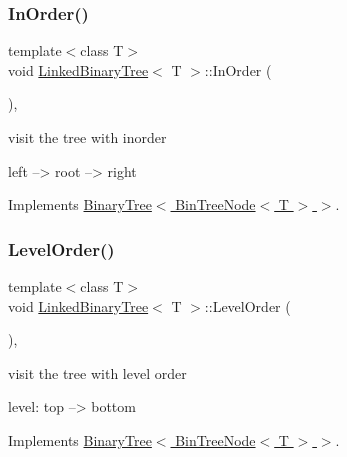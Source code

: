 \subsubsection{\texorpdfstring{In\+Order()}{InOrder()}}
{\footnotesize\ttfamily template$<$class T$>$ \\
void \hyperlink{classLinkedBinaryTree}{Linked\+Binary\+Tree}$<$ T $>$\+::In\+Order (\begin{DoxyParamCaption}\item[{void($\ast$)(\hyperlink{structBinTreeNode}{Bin\+Tree\+Node}$<$ T $>$ $\ast$)}]{ }\end{DoxyParamCaption})\hspace{0.3cm}{\ttfamily [inline]}, {\ttfamily [virtual]}}

visit the tree with inorder \begin{DoxyVerb}left --> root --> right
\end{DoxyVerb}
 

Implements \hyperlink{classBinaryTree_a45706a2cafb858f169506470ae440c8a}{Binary\+Tree$<$ Bin\+Tree\+Node$<$ T $>$ $>$}.

\mbox{\label{classLinkedBinaryTree_a5ca48cd9b784ca7cdf0f41d03dbc4873}} 
\subsubsection{\texorpdfstring{Level\+Order()}{LevelOrder()}}
{\footnotesize\ttfamily template$<$class T$>$ \\
void \hyperlink{classLinkedBinaryTree}{Linked\+Binary\+Tree}$<$ T $>$\+::Level\+Order (\begin{DoxyParamCaption}\item[{void($\ast$)(\hyperlink{structBinTreeNode}{Bin\+Tree\+Node}$<$ T $>$ $\ast$)}]{ }\end{DoxyParamCaption})\hspace{0.3cm}{\ttfamily [inline]}, {\ttfamily [virtual]}}

visit the tree with level order \begin{DoxyVerb}level: top --> bottom
\end{DoxyVerb}
 

Implements \hyperlink{classBinaryTree_a1d6ccf7f6b6e1b9a702b12fd5ca6dc32}{Binary\+Tree$<$ Bin\+Tree\+Node$<$ T $>$ $>$}.

